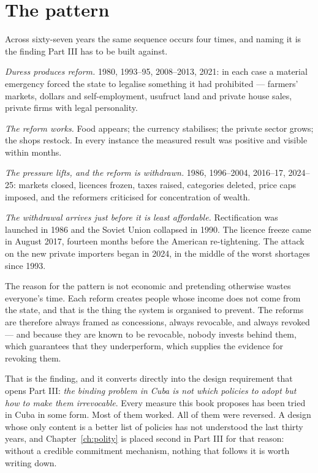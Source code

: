 \section{The pattern}

Across sixty-seven years the same sequence occurs four times, and naming it is
the finding Part III has to be built against.

\emph{Duress produces reform.} 1980, 1993--95, 2008--2013, 2021: in each case a
material emergency forced the state to legalise something it had prohibited ---
farmers' markets, dollars and self-employment, usufruct land and private house
sales, private firms with legal personality.

\emph{The reform works.} Food appears; the currency stabilises; the private
sector grows; the shops restock. In every instance the measured result was
positive and visible within months.

\emph{The pressure lifts, and the reform is withdrawn.} 1986, 1996--2004, 2016--17,
2024--25: markets closed, licences frozen, taxes raised, categories deleted,
price caps imposed, and the reformers criticised for concentration of wealth.

\emph{The withdrawal arrives just before it is least affordable.} Rectification
was launched in 1986 and the Soviet Union collapsed in 1990. The licence freeze
came in August 2017, fourteen months before the American re-tightening. The
attack on the new private importers began in 2024, in the middle of the worst
shortages since 1993.

The reason for the pattern is not economic and pretending otherwise wastes
everyone's time. Each reform creates people whose income does not come from the
state, and that is the thing the system is organised to prevent. The reforms are
therefore always framed as concessions, always revocable, and always revoked ---
and because they are known to be revocable, nobody invests behind them, which
guarantees that they underperform, which supplies the evidence for revoking
them.

That is the finding, and it converts directly into the design requirement that
opens Part III: \emph{the binding problem in Cuba is not which policies to
adopt but how to make them irrevocable}. Every measure this book proposes has
been tried in Cuba in some form. Most of them worked. All of them were reversed.
A design whose only content is a better list of policies has not understood the
last thirty years, and Chapter~\ref{ch:polity} is placed second in Part III for
that reason: without a credible commitment mechanism, nothing that follows it is
worth writing down.

